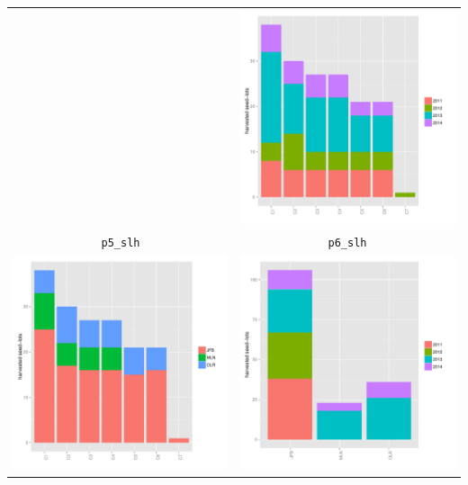 \documentclass{article}\usepackage[]{graphicx}\usepackage[]{color}
\newenvironment{knitrout}{}{} %
\begin{document}
\begin{itemize}
\begin{center}
\begin{tabular}{cc}
\begin{knitrout}
{}



\end{knitrout}
&
\begin{knitrout}
\definecolor{shadecolor}{rgb}{0.969, 0.969, 0.969}\color{fgcolor}

{\centering \includegraphics[width=.4\textwidth]{figures/shinemas2R_unnamed-chunk-32-1} 

}



\end{knitrout}
\\
\texttt{p5\_slh} & \texttt{p6\_slh} \\
\begin{knitrout}
\definecolor{shadecolor}{rgb}{0.969, 0.969, 0.969}\color{fgcolor}

{\centering \includegraphics[width=.4\textwidth]{figures/shinemas2R_unnamed-chunk-33-1} 

}



\end{knitrout}
&
\begin{knitrout}
\definecolor{shadecolor}{rgb}{0.969, 0.969, 0.969}\color{fgcolor}

{\centering \includegraphics[width=.4\textwidth]{figures/shinemas2R_unnamed-chunk-34-1} 

}
\end{knitrout}
\end{tabular}
\end{center}
\end{itemize}
\end{document}
